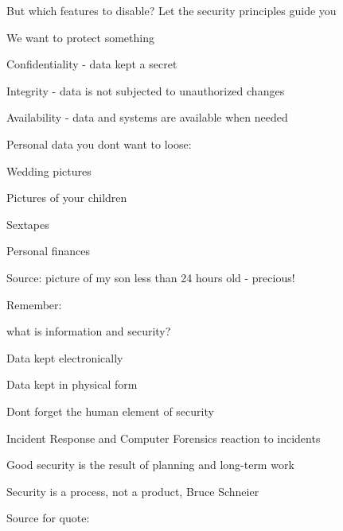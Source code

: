 \documentclass[Screen16to9,17pt]{foils}
\begin{document}
But which features to disable? Let the security principles guide you



\begin{list1}
\item We want to protect something
\item Confidentiality - data kept a secret
\item Integrity - data is not subjected to unauthorized changes
\item Availability - data and systems are available when needed
\end{list1}


\begin{list1}
\item Personal data you dont want to loose:
\begin{list2}
\item Wedding pictures
\item Pictures of your children
\item Sextapes
\item Personal finances
\end{list2}
\end{list1}

Source: picture of my son less than 24 hours old - precious!


\begin{list1}
\item Remember:
\begin{list2}
\item what is information and security?
\item Data kept electronically
\item Data kept in physical form
\item Dont forget the human element of security
\end{list2}
\item Incident Response and Computer Forensics reaction to incidents
\item Good security is the result of planning and long-term work
\end{list1}
\vskip 1cm
\centerline{\color{titlecolor}\LARGE Security is a process, not a product, Bruce Schneier}

Source for quote: 
\end{document}
